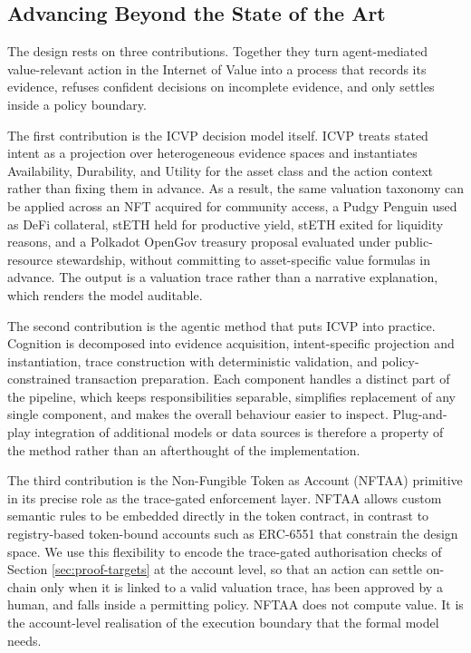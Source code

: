 \subsection{Advancing Beyond the State of the Art}

The design rests on three contributions. Together they turn agent-mediated value-relevant action in the Internet of Value into a process that records its evidence, refuses confident decisions on incomplete evidence, and only settles inside a policy boundary.

The first contribution is the ICVP decision model itself. ICVP treats stated intent as a projection over heterogeneous evidence spaces and instantiates Availability, Durability, and Utility for the asset class and the action context rather than fixing them in advance. As a result, the same valuation taxonomy can be applied across an NFT acquired for community access, a Pudgy Penguin used as DeFi collateral, stETH held for productive yield, stETH exited for liquidity reasons, and a Polkadot OpenGov treasury proposal evaluated under public-resource stewardship, without committing to asset-specific value formulas in advance. The output is a valuation trace rather than a narrative explanation, which renders the model auditable.

The second contribution is the agentic method that puts ICVP into practice. Cognition is decomposed into evidence acquisition, intent-specific projection and instantiation, trace construction with deterministic validation, and policy-constrained transaction preparation. Each component handles a distinct part of the pipeline, which keeps responsibilities separable, simplifies replacement of any single component, and makes the overall behaviour easier to inspect. Plug-and-play integration of additional models or data sources is therefore a property of the method rather than an afterthought of the implementation.

The third contribution is the Non-Fungible Token as Account (NFTAA) primitive in its precise role as the trace-gated enforcement layer. NFTAA allows custom semantic rules to be embedded directly in the token contract, in contrast to registry-based token-bound accounts such as ERC-6551 that constrain the design space. We use this flexibility to encode the trace-gated authorisation checks of Section \ref{sec:proof-targets} at the account level, so that an action can settle on-chain only when it is linked to a valid valuation trace, has been approved by a human, and falls inside a permitting policy. NFTAA does not compute value. It is the account-level realisation of the execution boundary that the formal model needs.

